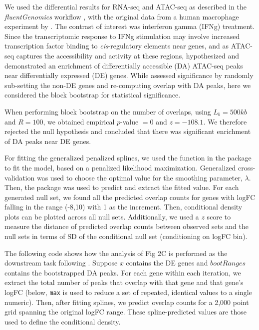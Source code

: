 \documentclass{article}
\begin{document}
We used the differential results for RNA-seq and ATAC-seq as
described in the \textit{fluentGenomics} workflow \citep{lee2020fluent}, with
the original data from a human macrophage experiment by \citet{alasoo2018shared}.
The contrast of interest was interferon gamma (IFNg) treatment. Since the
transcriptomic response to IFNg stimulation may involve increased
transcription factor binding to \textit{cis}-regulatory elements near
genes, and as ATAC-seq captures the accessibility and activity at
these regions, \citet{lee2020fluent} hypothesized and demonstrated an
enrichment of differentially accessible (DA) ATAC-seq peaks near
differentially expressed (DE) genes. While \citet{lee2020fluent}
assessed significance by randomly sub-setting the non-DE genes and
re-computing overlap with DA peaks, here we considered the block
bootstrap for statistical significance.

When performing block bootstrap on the number of overlaps,
using $L_b = 500kb$ and $R = 100$,
we obtained empirical $\textit{p}$-value $=0$ and $z = -108.1$.
We therefore rejected the null hypothesis and concluded that there was
significant enrichment of DA peaks near DE genes.

For fitting the generalized penalized splines, we used the  function in
the  package \citep{mgcv2011wood} to fit the model, based on
a penalized likelihood maximization. Generalized cross-validation
was used to choose the optimal value for the smoothing parameter,
$\lambda$. Then, the  package was used to predict and
extract the fitted value. 
For each generated null set, we found all the predicted overlap counts
for genes with logFC falling in the range (-8,10) with 1 as the
increment. Then, conditional density plots can be plotted across all
null sets. Additionally, we used a $z$ score to measure the distance of
predicted overlap counts between observed sets and the null sets in
terms of SD of the conditional null set (conditioning on logFC bin).

The following code shows how the analysis of Fig 2C is performed as
the downstream task following \bootranges. Suppose $x$ contains the DE genes and
$bootRanges$ contains the bootstrapped DA peaks. For each gene within each
iteration, we extract the total number of peaks that overlap with that
gene and that gene's logFC
(below, \texttt{max} is used to reduce a set
of repeated, identical values to a single numeric).
Then, after fitting splines, we predict
overlap counts for a 2,000 point grid spanning the original logFC range.
These spline-predicted values are those used to define the conditional
density.
\end{document}
